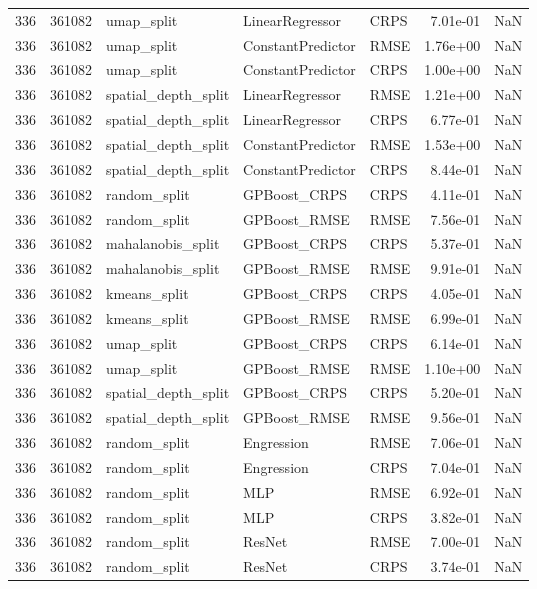 \begin{tabular}{rrlllrr}
336 & 361082 & umap\_split & LinearRegressor & CRPS & 7.01e-01 & NaN \\
336 & 361082 & umap\_split & ConstantPredictor & RMSE & 1.76e+00 & NaN \\
336 & 361082 & umap\_split & ConstantPredictor & CRPS & 1.00e+00 & NaN \\
336 & 361082 & spatial\_depth\_split & LinearRegressor & RMSE & 1.21e+00 & NaN \\
336 & 361082 & spatial\_depth\_split & LinearRegressor & CRPS & 6.77e-01 & NaN \\
336 & 361082 & spatial\_depth\_split & ConstantPredictor & RMSE & 1.53e+00 & NaN \\
336 & 361082 & spatial\_depth\_split & ConstantPredictor & CRPS & 8.44e-01 & NaN \\
336 & 361082 & random\_split & GPBoost\_CRPS & CRPS & 4.11e-01 & NaN \\
336 & 361082 & random\_split & GPBoost\_RMSE & RMSE & 7.56e-01 & NaN \\
336 & 361082 & mahalanobis\_split & GPBoost\_CRPS & CRPS & 5.37e-01 & NaN \\
336 & 361082 & mahalanobis\_split & GPBoost\_RMSE & RMSE & 9.91e-01 & NaN \\
336 & 361082 & kmeans\_split & GPBoost\_CRPS & CRPS & 4.05e-01 & NaN \\
336 & 361082 & kmeans\_split & GPBoost\_RMSE & RMSE & 6.99e-01 & NaN \\
336 & 361082 & umap\_split & GPBoost\_CRPS & CRPS & 6.14e-01 & NaN \\
336 & 361082 & umap\_split & GPBoost\_RMSE & RMSE & 1.10e+00 & NaN \\
336 & 361082 & spatial\_depth\_split & GPBoost\_CRPS & CRPS & 5.20e-01 & NaN \\
336 & 361082 & spatial\_depth\_split & GPBoost\_RMSE & RMSE & 9.56e-01 & NaN \\
336 & 361082 & random\_split & Engression & RMSE & 7.06e-01 & NaN \\
336 & 361082 & random\_split & Engression & CRPS & 7.04e-01 & NaN \\
336 & 361082 & random\_split & MLP & RMSE & 6.92e-01 & NaN \\
336 & 361082 & random\_split & MLP & CRPS & 3.82e-01 & NaN \\
336 & 361082 & random\_split & ResNet & RMSE & 7.00e-01 & NaN \\
336 & 361082 & random\_split & ResNet & CRPS & 3.74e-01 & NaN \\

\end{tabular}
